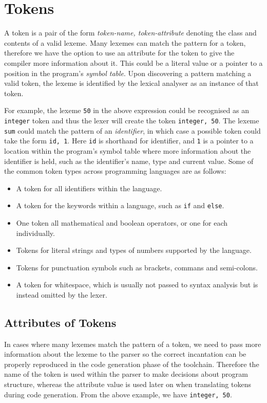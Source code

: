 \documentclass[a4paper, 11pt]{article}
\begin{document}
\section{Tokens}
A token is a pair of the form \textlangle{}\textit{token-name, token-attribute}\textrangle{} denoting the class and contents of a valid lexeme. Many lexemes can match the pattern for a token, therefore we have the option to use an attribute for the token to give the compiler more information about it. This could be a literal value or a pointer to a position in the program's \textit{symbol table}. Upon discovering a pattern matching a valid token, the lexeme is identified by the lexical analyser as an instance of that token. 

For example, the lexeme \texttt{50} in the above expression could be recognised as an \texttt{integer} token and thus the lexer will create the token \textlangle{}\texttt{integer, 50}\textrangle{}. The lexeme \texttt{sum} could match the pattern of an \textit{identifier}, in which case a possible token could take the form \textlangle{}\texttt{id, 1}\textrangle{}. Here \texttt{id} is shorthand for identifier, and \texttt{1} is a pointer to a location within the program's symbol table where more information about the identifier is held, such as the identifier's name, type and current value. Some of the common token types across programming languages are as follows:

\begin{itemize}
\item A token for all identifiers within the language.
\item A token for the keywords within a language, such as \texttt{if} and \texttt{else}.
\item One token all mathematical and boolean operators, or one for each individually.
\item Tokens for literal strings and types of numbers supported by the language.
\item Tokens for punctuation symbols such as brackets, commans and semi-colons.
\item A token for whitespace, which is usually not passed to syntax analysis but is instead omitted by the lexer.
\end{itemize}

\subsection{Attributes of Tokens}
In cases where many lexemes match the pattern of a token, we need to pass more information about the lexeme to the parser so the correct incantation can be properly reproduced in the code generation phase of the toolchain. Therefore the name of the token is used within the parser to make decisions about program structure, whereas the attribute value is used later on when translating tokens during code generation. From the above example, we have \textlangle{}\texttt{integer, 50}\textrangle{}.
\end{document}
